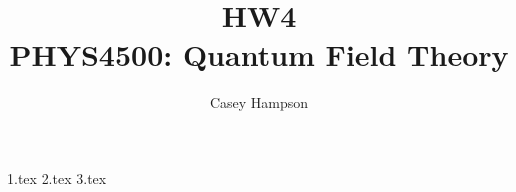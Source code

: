 \documentclass[titlepage]{article}
\title{HW4 \\[5pt] PHYS4500: Quantum Field Theory}
\author{Casey Hampson}
\begin{document}
    \maketitle
    \pagebreak

    {1.tex} %
    {2.tex} %
    {3.tex} %
\end{document}

